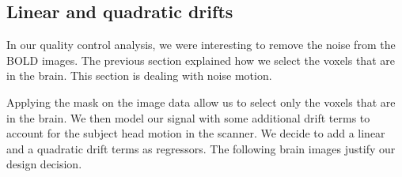 \subsection{Linear and quadratic drifts}
\noindent
\par In our quality control analysis, we were interesting to remove the noise
from the BOLD images. The previous section explained how we select the voxels
that are in the brain. This section is dealing with noise motion. 

\noindent
\par Applying the mask on the image data allow us to select only the voxels that
are in the brain. 
We then model our signal with some additional drift terms to account for
the subject head motion in the scanner. We decide to add a linear and a 
quadratic drift terms as regressors. The following brain images justify
our design decision.

